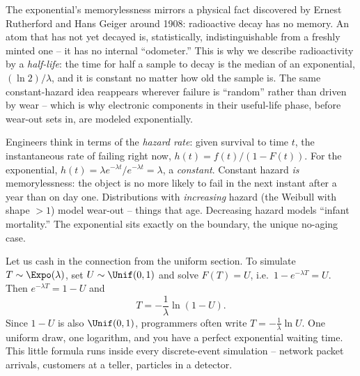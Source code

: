 \begin{historybox}
The exponential's memorylessness mirrors a physical fact discovered by Ernest
Rutherford and Hans Geiger around 1908: radioactive decay has no memory. An atom
that has not yet decayed is, statistically, indistinguishable from a freshly
minted one -- it has no internal ``odometer.'' This is why we describe
radioactivity by a \emph{half-life}: the time for half a sample to decay is the
median of an exponential, $(\ln 2)/\lambda$, and it is constant no matter how old
the sample is. The same constant-hazard idea reappears wherever failure is
``random'' rather than driven by wear -- which is why electronic components in
their useful-life phase, before wear-out sets in, are modeled exponentially.
\end{historybox}

\begin{connectionbox}
Engineers think in terms of the \emph{hazard rate}: given survival to time $t$,
the instantaneous rate of failing right now, $h(t) = f(t)/(1-F(t))$. For the
exponential, $h(t) = \lambda e^{-\lambda t}/e^{-\lambda t} = \lambda$, a
\emph{constant}. Constant hazard \emph{is} memorylessness: the object is no more
likely to fail in the next instant after a year than on day one. Distributions
with \emph{increasing} hazard (the Weibull with shape $>1$) model wear-out --
things that age. Decreasing hazard models ``infant mortality.'' The exponential
sits exactly on the boundary, the unique no-aging case.
\end{connectionbox}

\begin{example}
\label{ch11:ex-inverse}
Let us cash in the connection from the uniform section. To simulate
$T\sim\Expo(\lambda)$, set $U\sim\Unif(0,1)$ and solve $F(T)=U$, i.e.\
$1 - e^{-\lambda T} = U$. Then $e^{-\lambda T} = 1-U$ and
\[
  T = -\frac{1}{\lambda}\ln(1-U).
\]
Since $1-U$ is also $\Unif(0,1)$, programmers often write
$T = -\tfrac{1}{\lambda}\ln U$. One uniform draw, one logarithm, and you have a
perfect exponential waiting time. This little formula runs inside every
discrete-event simulation -- network packet arrivals, customers at a teller,
particles in a detector.
\end{example}

